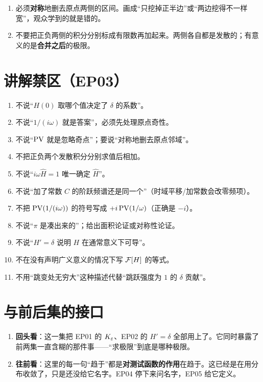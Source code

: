 \begin{warnbox}[主值动画的两条纪律]
\begin{enumerate}[leftmargin=1.4em,itemsep=0.3em]
\item 必须\textbf{对称}地删去原点两侧的区间。画成“只挖掉正半边”或“两边挖得不一样宽”，观众学到的就是错的。
\item 不要把正负两侧的积分分别标成有限数再加起来。两侧各自都是发散的；有意义的是\textbf{合并之后}的极限。
\end{enumerate}
\end{warnbox}

\section{讲解禁区（EP03）}

\begin{warnbox}[逐条对照]
\begin{enumerate}[leftmargin=1.6em,itemsep=0.28em]
\item 不说“$H(0)$ 取哪个值决定了 $\delta$ 的系数”。
\item 不说“$1/(i\omega)$ 就是答案”，必须先处理原点奇性。
\item 不说“$\operatorname{PV}$ 就是忽略奇点”；要说“对称地删去原点邻域”。
\item 不把正负两个发散积分分别求值后相加。
\item 不说“$i\omega\widehat H=1$ 唯一确定 $\widehat H$”。
\item 不说“加了常数 $C$ 的阶跃频谱还是同一个”（时域平移/加常数会改零频项）。
\item 不把 $\operatorname{PV}(1/(i\omega))$ 的符号写成 $+i\operatorname{PV}(1/\omega)$（正确是 $-i$）。
\item 不说“$\pi$ 是凑出来的”；给出面积论证或对称性论证。
\item 不说“$H'=\delta$ 说明 $H$ 在通常意义下可导”。
\item 不在没有声明广义意义的情况下写 $\mathcal{F}[H]$ 的等式。
\item 不用“跳变处无穷大”这种描述代替“跳跃强度为 $1$ 的 $\delta$ 贡献”。
\end{enumerate}
\end{warnbox}

\section{与前后集的接口}

\begin{enumerate}[leftmargin=2em,itemsep=0.45em]
\item \textbf{回头看}：这一集把 EP01 的 $K_\varepsilon$、EP02 的 $H'=\delta$ 全部用上了。它同时暴露了前两集一直含糊的那件事——“求极限”到底是哪种极限。
\item \textbf{往前看}：这里的每一句“趋于”都是\textbf{对测试函数的作用}在趋于。这已经是在用分布收敛了，只是还没给它名字。EP04 停下来问名字，EP05 给它定义。
\end{enumerate}

